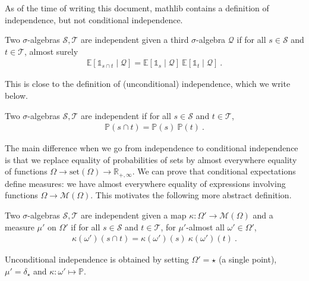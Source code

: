 
As of the time of writing this document, mathlib contains a definition of independence, but not conditional independence.

\begin{definition}
Two $\sigma$-algebras $\mathcal S, \mathcal T$ are independent given a third $\sigma$-algebra $\mathcal Q$ if for all $s \in \mathcal S$ and $t \in \mathcal T$, almost surely
\begin{align*}
\mathbb{E}[\mathbb{1}_{s \cap t} \mid \mathcal Q] = \mathbb{E}[\mathbb{1}_{s} \mid \mathcal Q] \: \mathbb{E}[\mathbb{1}_{t} \mid \mathcal Q]
\: .
\end{align*}
\end{definition}

This is close to the definition of (unconditional) independence, which we write below.
\begin{definition}
Two $\sigma$-algebras $\mathcal S, \mathcal T$ are independent if for all $s \in \mathcal S$ and $t \in \mathcal T$,
\begin{align*}
\mathbb{P}(s \cap t) = \mathbb{P}(s) \: \mathbb{P}(t)
\: .
\end{align*}
\end{definition}

The main difference when we go from independence to conditional independence is that we replace equality of probabilities of sets by almost everywhere equality of functions $\Omega \to \text{set}(\Omega) \to \mathbb{R}_{+,\infty}$. We can prove that conditional expectations define measures: we have almost everywhere equality of expressions involving functions $\Omega \to \mathcal M(\Omega)$. This motivates the following more abstract definition.

\begin{definition}\label{def:independence_wrt_map}
Two $\sigma$-algebras $\mathcal S, \mathcal T$ are independent given a map $\kappa : \Omega' \to \mathcal M(\Omega)$ and a measure $\mu'$ on $\Omega'$ if for all $s \in \mathcal S$ and $t \in \mathcal T$, for $\mu'$-almost all $\omega' \in \Omega'$,
\begin{align*}
\kappa (\omega') (s \cap t) = \kappa (\omega') (s) \: \kappa (\omega') (t)
\: .
\end{align*}
\end{definition}

Unconditional independence is obtained by setting $\Omega' = \star$ (a single point), $\mu' = \delta_\star$ and $\kappa : \omega' \mapsto \mathbb{P}$.

